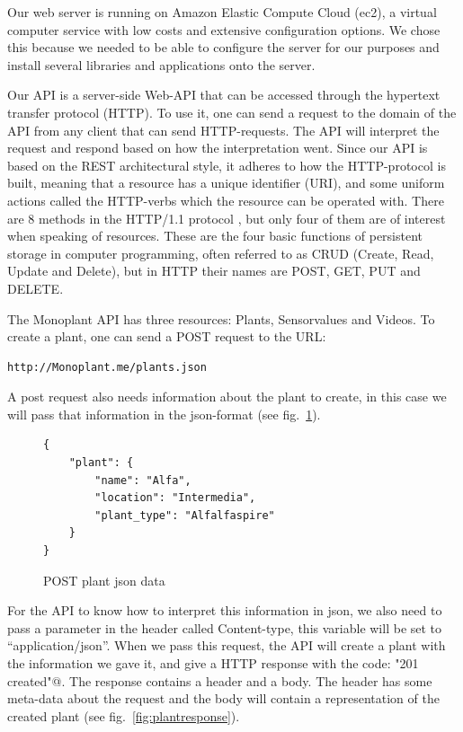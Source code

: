 Our web server is running on Amazon Elastic Compute Cloud (ec2), a virtual computer service with low costs and extensive configuration options. We chose this because we needed to be able to configure the server for our purposes and install several libraries and applications onto the server. 

Our API is a server-side Web-API that can be accessed through the hypertext transfer protocol (HTTP). To use it, one can send a request to the domain of the API from any client that can send HTTP-requests. The API will interpret the request and respond based on how the interpretation went. Since our API is based on the REST architectural style, it adheres to how the HTTP-protocol is built, meaning that a resource has a unique identifier (URI), and some uniform actions called the HTTP-verbs which the resource can be operated with. There are 8 methods in the HTTP/1.1 protocol \citep[p. 36]{fielding1999hypertext}, but only four of them are of interest when speaking of resources. These are the four basic functions of persistent storage in computer programming, often referred to as CRUD (Create, Read, Update and Delete), but in HTTP their names are POST, GET, PUT and DELETE. 

The Monoplant API has three resources: Plants, Sensorvalues and Videos. To create a plant, one can send a POST request to the URL: \begin{verbatim}http://Monoplant.me/plants.json\end{verbatim} A post request also needs information about the plant to create, in this case we will pass that information in the json-format (see fig.~\ref{fig:postdata}).

\begin{figure}
	\begin{lstlisting}[style=htmlcssjs]
{
	"plant": {
		"name": "Alfa",
		"location": "Intermedia",
		"plant_type": "Alfalfaspire"
	}
}
	\end{lstlisting}
	\caption{POST plant json data}
	\label{fig:postdata}
\end{figure}

For the API to know how to interpret this information in json, we also need to pass a parameter in the header called Content-type, this variable will be set to “application/json”. When we pass this request, the API will create a plant with the information we gave it, and give a HTTP response with the code: \verb@"201 created"@. The response contains a header and a body. The header has some meta-data about the request and the body will contain a representation of the created plant (see fig.~\ref{fig:plantresponse}).

